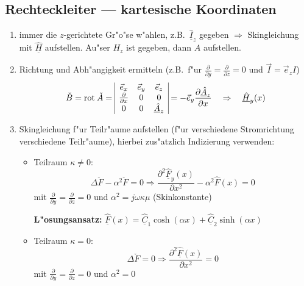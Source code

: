 \subsection{Rechteckleiter --- kartesische Koordinaten}
\begin{enumerate}
\item immer die $z$-gerichtete Gr"o"se w"ahlen, z.B.\
      $\underline{\hat{I}}_z$ gegeben $\Rightarrow$ Skingleichung mit
      $\underline{\hat{H}}$ aufstellen. Au"ser $H_z$ ist gegeben, dann $A$
      aufstellen.
\item Richtung und Abh"angigkeit ermitteln (z.B.\ f"ur $\frac{\partial}{\partial
      y} = \frac{\partial}{\partial z}=0$ und $\vec{I}=\vec{e}_z I$)
      $$\check{B}={\rm rot \:} \check{A} =
      \begin{array}{|ccc|}\vec{e}_x&\vec{e}_y&\vec{e}_z\\
      \frac{\partial}{\partial x}&0&0\\0&0&\underline{\hat{A}}_z\\ \end{array} =
      -\vec{e}_y \frac{\partial \underline{\hat{A}}_z}{\partial x} \quad
      \Rightarrow\quad \underline{\hat{H}}_y(x)$$
\item Skingleichung f"ur Teilr"aume aufstellen (f"ur verschiedene Stromrichtung
      verschiedene Teilr"aume), hierbei zus"atzlich Indizierung verwenden:
   \begin{itemize}
   \item Teilraum $\kappa \not= 0$:
         $$\Delta \check{F} - \alpha^2 \check{F} =0 \Rightarrow \frac{\partial^2
         \underline{\hat{F}}_y(x)}{\partial x^2}-\alpha^2 \hat{F}(x) =0$$
         mit $\frac{\partial}{\partial y}=\frac{\partial}{\partial z}=0$
         und $\alpha^2 =j\omega \kappa \mu$ (Skinkonstante)

         {\bf L"osungsansatz:} $\underline{\hat{F}}(x)=\underline{\hat{C}}_1 \cosh(\alpha
                      x)+\underline{\hat{C}}_2 \sinh(\alpha x)$

    \item Teilraum $\kappa = 0$:
          $$\Delta \check{F} =0 \Rightarrow \frac{\partial^2 \underline{\hat{F}}(x)}{
          \partial x^2}=0$$ mit $\frac{\partial}{\partial y}=
          \frac{\partial}{\partial z}=0$ und $\alpha^2 =0$


\end{itemize}
\end{enumerate}
